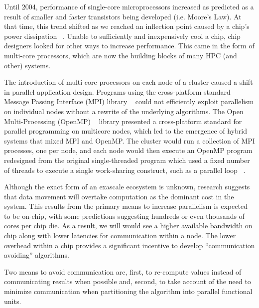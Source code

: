 \label{sec:reaching}

Until 2004, performance of single-core microprocessors increased as
predicted as a result of smaller and faster transistors being
developed (i.e. Moore's Law). At that time, this trend shifted as we
reached an inflection point caused by a chip’s power dissipation
~\cite{kogge2013exascale}. Unable to sufficiently and inexpensively
cool a chip, chip designers looked for other ways to increase
performance. This came in the form of multi-core processors, which are
now the building blocks of many HPC (and other) systems.

The introduction of multi-core processors on each node of a cluster
caused a shift in parallel application design. Programs using the
cross-platform standard Message Passing Interface (MPI) library
~\cite{Snir:1998:MCR:552013} could not efficiently exploit parallelism
on individual nodes without a rewrite of the underlying algorithms.
The Open Multi-Processing (OpenMP) ~\cite{openmp08} library presented
a cross-platform standard for parallel programming on multicore nodes,
which led to the emergence of hybrid systems that mixed MPI and
OpenMP. The cluster would run a collection of MPI processes, one per
node, and each node would then execute an OpenMP program redesigned
from the original single-threaded program which used a fixed number of
threads to execute a single work-sharing construct, such as a parallel
loop ~\cite{gropp2013programming}.

Although the exact form of an exascale ecosystem is unknown, research
suggests that data movement will overtake computation as the dominant
cost in the system.
This results from the primary means to increase parallelism is
expected to be on-chip, with some predictions
suggesting hundreds or even thousands of cores
per chip die.
As a result, we will would see a higher available bandwidth on
chip along with lower latencies for communication within a node.
The
lower overhead within a chip provides a significant incentive to
develop ``communication avoiding'' algorithms.

Two means to avoid communication are, first, to re-compute values
instead of communicating results when possible and, second, to take
account of the need to minimize communication when partitioning the
algorithm into parallel functional units.

